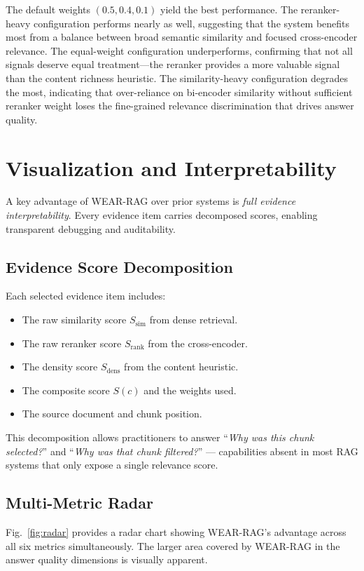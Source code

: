 \documentclass[conference]{IEEEtran}
\begin{document}
The default weights $(0.5, 0.4, 0.1)$ yield the best performance. The reranker-heavy configuration performs nearly as well, suggesting that the system benefits most from a balance between broad semantic similarity and focused cross-encoder relevance. The equal-weight configuration underperforms, confirming that not all signals deserve equal treatment---the reranker provides a more valuable signal than the content richness heuristic. The similarity-heavy configuration degrades the most, indicating that over-reliance on bi-encoder similarity without sufficient reranker weight loses the fine-grained relevance discrimination that drives answer quality.

\section{Visualization and Interpretability}

A key advantage of WEAR-RAG over prior systems is \textit{full evidence interpretability}. Every evidence item carries decomposed scores, enabling transparent debugging and auditability.

\subsection{Evidence Score Decomposition}
Each selected evidence item includes:
\begin{itemize}[leftmargin=*]
\item The raw similarity score $S_{\text{sim}}$ from dense retrieval.
\item The raw reranker score $S_{\text{rank}}$ from the cross-encoder.
\item The density score $S_{\text{dens}}$ from the content heuristic.
\item The composite score $S(c)$ and the weights used.
\item The source document and chunk position.
\end{itemize}

This decomposition allows practitioners to answer ``\textit{Why was this chunk selected?}'' and ``\textit{Why was that chunk filtered?}'' --- capabilities absent in most RAG systems that only expose a single relevance score.

\subsection{Multi-Metric Radar}
Fig.~\ref{fig:radar} provides a radar chart showing WEAR-RAG's advantage across all six metrics simultaneously. The larger area covered by WEAR-RAG in the answer quality dimensions is visually apparent.
\end{document}
